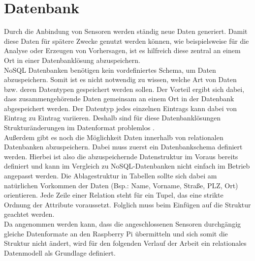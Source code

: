 \section{Datenbank}
Durch die Anbindung von Sensoren werden ständig neue Daten generiert. Damit diese Daten für spätere Zwecke genutzt werden können, wie beispielsweise für die Analyse oder Erzeugen von Vorhersagen, ist es hilfreich diese zentral an einem Ort in einer Datenbanklösung abzuspeichern.
\\NoSQL Datenbanken benötigen kein vordefiniertes Schema, um Daten abzuspeichern. Somit ist es nicht notwendig zu wissen, welche Art von Daten bzw. deren Datentypen gespeichert werden sollen. Der Vorteil ergibt sich dabei, dass zusammengehörende Daten gemeinsam an einem Ort in der Datenbank abgespeichert werden. Der Datentyp jedes einzelnen Eintrags kann dabei von Eintrag zu Eintrag variieren. Deshalb sind für diese Datenbanklösungen Strukturänderungen im Datenformat problemlos \cite{noSQL:noSQL}.
\\Außerdem gibt es noch die Möglichkeit Daten innerhalb von relationalen Datenbanken abzuspeichern. Dabei muss zuerst ein Datenbankschema definiert werden. Hierbei ist also die abzuspeichernde Datenstruktur im Voraus bereits definiert und kann im Vergleich zu NoSQL-Datenbanken nicht einfach im Betrieb angepasst werden. Die Ablagestruktur in Tabellen sollte sich dabei am natürlichen Vorkommen der Daten (Bsp.: Name, Vorname, Straße, PLZ, Ort)  orientieren. Jede Zeile einer Relation steht für ein Tupel, das eine strikte Ordnung der Attribute voraussetzt\cite{codd:Codd}. Folglich muss beim Einfügen auf die Struktur geachtet werden.
\\Da angenommen werden kann, dass die angeschlossenen Sensoren durchgängig gleiche Datenformate an den Raspberry Pi übermitteln und sich somit die Struktur nicht ändert, wird für den folgenden Verlauf der Arbeit ein relationales Datenmodell als Grundlage definiert.
